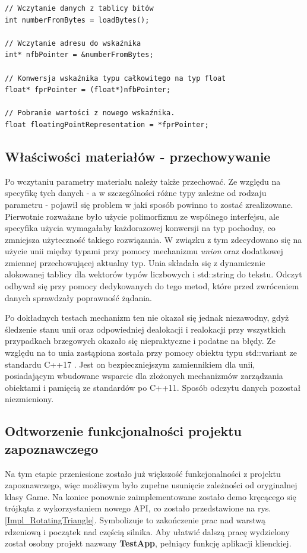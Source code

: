 \begin{lstlisting}[caption={Bitowa konwersja typu całkowitego na float w C++}, label={lst:module:floatingPointHack}]
// Wczytanie danych z tablicy bitów
int numberFromBytes = loadBytes();

// Wczytanie adresu do wskaźnika
int* nfbPointer = &numberFromBytes;

// Konwersja wskaźnika typu całkowitego na typ float
float* fprPointer = (float*)nfbPointer;

// Pobranie wartości z nowego wskaźnika.
float floatingPointRepresentation = *fprPointer;
\end{lstlisting}

\subsection{Właściwości materiałów - przechowywanie}
Po wczytaniu parametry materiału należy także przechować. Ze względu na specyfikę tych danych - a w szczególności różne typy zależne od rodzaju parametru - pojawił się problem w jaki sposób powinno to zostać zrealizowane. Pierwotnie rozważane było użycie polimorfizmu ze wspólnego interfejsu, ale specyfika użycia wymagałaby każdorazowej konwersji na typ pochodny, co zmniejsza użyteczność takiego rozwiązania. W związku z tym zdecydowano się na użycie unii między typami przy pomocy mechanizmu \textit{union} oraz dodatkowej zmiennej przechowującej aktualny typ. Unia składała się z dynamicznie alokowanej tablicy dla wektorów typów liczbowych i std::string do tekstu. Odczyt odbywał się przy pomocy dedykowanych do tego metod, które przed zwróceniem danych sprawdzały poprawność żądania. 

Po dokładnych testach mechanizm ten nie okazał się jednak niezawodny, gdyż śledzenie stanu unii oraz odpowiedniej dealokacji i realokacji przy wszystkich przypadkach brzegowych okazało się niepraktyczne i podatne na błędy. Ze względu na to unia zastąpiona została przy pomocy obiektu typu std::variant ze standardu C++17 \cite{cpp17:variant:2025}. Jest on bezpieczniejszym zamiennikiem dla unii, posiadającym wbudowane wsparcie dla złożonych mechanizmów zarządzania obiektami i pamięcią ze standardów po C++11. Sposób odczytu danych pozostał niezmieniony.

\subsection{Odtworzenie funkcjonalności projektu zapoznawczego}
Na tym etapie przeniesione zostało już większość funkcjonalności z projektu zapoznawczego, więc możliwym było zupełne usunięcie zależności od oryginalnej klasy Game. Na koniec ponownie zaimplementowane zostało demo kręcącego się trójkąta z wykorzystaniem nowego API, co zostało przedstawione na rys. \ref{Impl_RotatingTriangle}. Symbolizuje to zakończenie prac nad warstwą rdzeniową i początek nad częścią silnika. Aby ułatwić dalszą pracę wydzielony został osobny projekt nazwany \textbf{TestApp}, pełniący funkcję aplikacji klienckiej.

